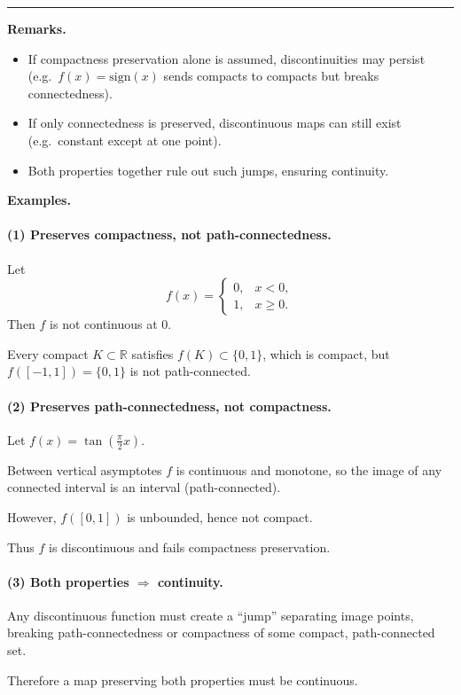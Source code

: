 \documentclass[12pt,a4paper]{article}
\theoremstyle{plain}
\theoremstyle{definition}
\theoremstyle{remark}
\theoremstyle{remark}
\newcommand{\sep}{\vspace{6pt}\hrule\vspace{8pt}}
\begin{document}
	\sep
	
	\textbf{Remarks.}
	\begin{itemize}
		\item If compactness preservation alone is assumed, discontinuities may persist
		(e.g.\ $f(x)=\text{sign}(x)$ sends compacts to compacts but breaks connectedness).
		\item If only connectedness is preserved, discontinuous maps can still exist
		(e.g.\ constant except at one point).
		\item Both properties together rule out such jumps, ensuring continuity.
	\end{itemize}
	\textbf{Examples.}
	
	\paragraph{(1) Preserves compactness, not path-connectedness.}
	Let
	\[
	f(x)=
	\begin{cases}
		0,& x<0,\\
		1,& x\ge0.
	\end{cases}
	\]
	Then $f$ is not continuous at $0$.

	Every compact $K\subset\mathbb{R}$ satisfies $f(K)\subset\{0,1\}$, which is compact,
	but $f([-1,1])=\{0,1\}$ is not path-connected.
	
	\paragraph{(2) Preserves path-connectedness, not compactness.}
	Let $f(x)=\tan\!\left(\frac{\pi}{2}x\right)$.

	Between vertical asymptotes $f$ is continuous and monotone,
	so the image of any connected interval is an interval (path-connected).

	However, $f([0,1])$ is unbounded, hence not compact.

	Thus $f$ is discontinuous and fails compactness preservation.
	
	\paragraph{(3) Both properties $\Rightarrow$ continuity.}
	Any discontinuous function must create a ``jump'' separating image points,
	breaking path-connectedness or compactness of some compact, path-connected set.

	Therefore a map preserving both properties must be continuous.
	
\end{document}
